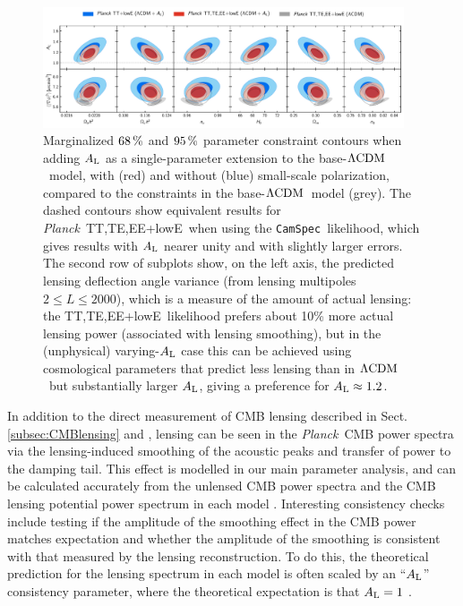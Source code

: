 \documentclass[longauth,traditabstract]{aa}
\def\Planck{\textit{Planck}}
\def\,{\thinspace}
\newcommand{\camspec}{{\tt CamSpec}}
\newcommand{\mksym}[1]{\ifmmode {\rm #1}\else #1\fi}
\newcommand{\dataplus}{\allowbreak+}
\newcommand{\TTTEEE}{\mksym{TT,TE,EE}}
\newcommand{\planckTTTEEEonly}{\planck\ \TTTEEE}
\newcommand{\lowE}{\mksym{lowE}}
\newcommand{\planckall}{\planckTTTEEEonly\dataplus\lowE}
\newcommand{\shortall}{\TTTEEE\dataplus\lowE}
\newcommand{\lcdm}{\texorpdfstring{{$\rm{\Lambda CDM}$}}{ΛCDM}}
\newcommand{\Alens}{A_{\rm L}}
\providecommand{\LCDM}{{$\rm{\Lambda CDM}$}}
\newcommand{\PlanckLensThree}{\citetalias{planck2016-l08}}
\newcommand{\planck}{\Planck}
\begin{document}
\begin{figure}[t]
\centering
\includegraphics[width=0.95\textwidth]{Alens_degeneracies.pdf}
\caption{
Marginalized $68\,\%$ and $95\,\%$ parameter constraint contours when adding $\Alens$ as a single-parameter extension to the base-\LCDM\ model, with (red) and without (blue) small-scale polarization,
 compared to the constraints in the base-\lcdm\ model (grey). The dashed contours show equivalent results for \planckall\ when using the \camspec\ likelihood, which gives results with $\Alens$ nearer unity and with slightly larger errors. The second row of subplots show, on the left axis, the predicted lensing deflection angle variance (from lensing multipoles $2\le L\le 2000$), which is a measure of the amount of actual lensing: the \shortall\ likelihood prefers about 10\,\% more actual lensing power (associated with lensing smoothing), but in the (unphysical) varying-$\Alens$ case this can be achieved using cosmological parameters that predict less lensing than in \lcdm\ but substantially larger $\Alens$, giving a preference for $\Alens\approx 1.2$.
\label{fig:Alens_degen}
}
\end{figure}

In addition to the direct measurement of CMB lensing described in Sect.
\ref{subsec:CMBlensing} and \PlanckLensThree, lensing can be seen in the \planck\ CMB power spectra via the lensing-induced smoothing of the acoustic peaks
and transfer of power to the damping tail.
This effect is modelled in our main parameter analysis, and can be calculated accurately from the unlensed CMB power spectra and the CMB lensing potential power spectrum in each model \citep{Seljak:1995ve,Lewis:2006fu}. Interesting consistency checks include testing if the amplitude of the smoothing effect in the CMB power matches expectation and whether the amplitude of the smoothing is consistent with that measured by the lensing reconstruction. To do this,
 the theoretical prediction for the lensing spectrum in each model is often scaled by an ``$\Alens$'' consistency parameter, where the theoretical expectation is that $\Alens=1$ \citep{Calabrese:2008rt}.
\end{document}
